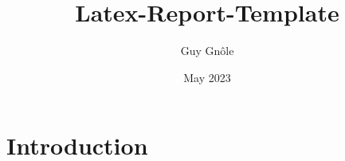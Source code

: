 \documentclass[12pt,openright]{scrreprt}
\title{Latex-Report-Template}
\author{Guy Gnôle}
\date{May 2023}
\begin{document}
\maketitle

\tableofcontents
\newpage

\chapter{Introduction}


\end{document}
